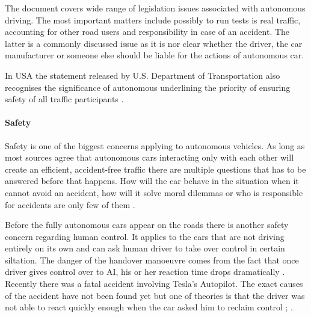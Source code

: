 \documentclass[11pt,english]{article}
\begin{document}
\par
The \citet{pathwaytodriverless2} document covers wide range of legislation issues associated with autonomous driving. The most important matters include possibly to run tests is real traffic, accounting for other road users and  responsibility in case of an accident. The latter is a commonly discussed issue as it is nor clear whether the driver, the car manufacturer or someone else should be liable for the actions of autonomous car. 

\par
In USA the statement released by U.S. Department of Transportation also recognises the significance of autonomous underlining the priority of ensuring safety of all traffic participants \citep{nhtsa1}.
\par








\paragraph{Safety}

Safety is one of the biggest concerns applying to autonomous vehicles. As long as most sources agree that autonomous cars interacting only with each other will create an efficient, accident-free traffic there are multiple questions that has to be answered before that happens. How will the car behave in the situation when it cannot avoid an accident, how will it solve moral dilemmas or who is responsible for accidents are only few of them \citep{techtimes}. 
 


\par
Before the fully autonomous cars appear on the roads there is another safety concern regarding human control. It applies to the cars that are not driving entirely on its own and can ask human driver to take over control in certain siltation. The danger of the handover manoeuvre comes from the fact that once driver gives control over to AI, his or her reaction time drops dramatically \citep{merat2009drivers}. Recently there was a fatal accident involving Tesla's Autopilot. The exact causes of the accident have not been found yet but one of theories is that the driver was not able to react quickly enough when the car asked him to reclaim control \citep{teslacrash}; \citep{tesla4}. 
\end{document}
